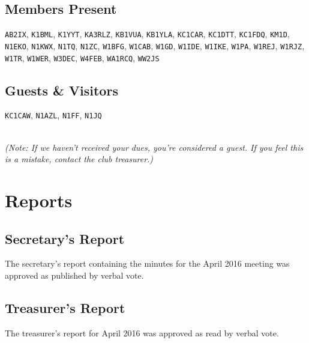 \documentclass[10pt,letterpaper]{article}
\begin{document}
\subsection{Members Present}

\texttt{AB2IX},
\texttt{K1BML},
\texttt{K1YYT},
\texttt{KA3RLZ},
\texttt{KB1VUA},
\texttt{KB1YLA},
\texttt{KC1CAR},
\texttt{KC1DTT},
\texttt{KC1FDQ},
\texttt{KM1D},
\texttt{N1EKO},
\texttt{N1KWX},
\texttt{N1TQ},
\texttt{N1ZC},
\texttt{W1BFG},
\texttt{W1CAB},
\texttt{W1GD},
\texttt{W1IDE},
\texttt{W1IKE},
\texttt{W1PA},
\texttt{W1REJ},
\texttt{W1RJZ},
\texttt{W1TR},
\texttt{W1WER},
\texttt{W3DEC},
\texttt{W4FEB},
\texttt{WA1RCQ},
\texttt{WW2JS}

\subsection{Guests \& Visitors}

\texttt{KC1CAW},
\texttt{N1AZL},
\texttt{N1FF},
\texttt{N1JQ}

\noindent\\
\emph{(Note: If we haven't received your dues, you're considered a guest. If you feel this is a mistake, contact the club treasurer.)}

\section{Reports}

\subsection{Secretary's Report}

The secretary's report containing the minutes for the April 2016 meeting was approved as published by verbal vote.

\newpage
\subsection{Treasurer's Report}

The treasurer's report for April 2016 was approved as read by verbal vote.
\end{document}
